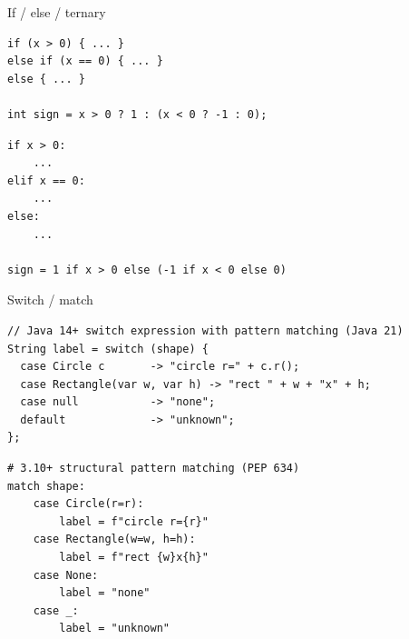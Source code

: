\documentclass[10pt]{article}
\begin{document}
\begin{construct}{If / else / ternary}
\noindent
\begin{minipage}[t]{0.485\linewidth}
\begin{lstlisting}[style=java, title=Java]
if (x > 0) { ... }
else if (x == 0) { ... }
else { ... }

int sign = x > 0 ? 1 : (x < 0 ? -1 : 0);
\end{lstlisting}
\end{minipage}\hfill
\begin{minipage}[t]{0.485\linewidth}
\begin{lstlisting}[style=python, title=Python]
if x > 0:
    ...
elif x == 0:
    ...
else:
    ...

sign = 1 if x > 0 else (-1 if x < 0 else 0)
\end{lstlisting}
\end{minipage}
\end{construct}

\begin{construct}{Switch / match}
\noindent
\begin{minipage}[t]{0.485\linewidth}
\begin{lstlisting}[style=java, title=Java]
// Java 14+ switch expression with pattern matching (Java 21)
String label = switch (shape) {
  case Circle c       -> "circle r=" + c.r();
  case Rectangle(var w, var h) -> "rect " + w + "x" + h;
  case null           -> "none";
  default             -> "unknown";
};
\end{lstlisting}
\end{minipage}\hfill
\begin{minipage}[t]{0.485\linewidth}
\begin{lstlisting}[style=python, title=Python]
# 3.10+ structural pattern matching (PEP 634)
match shape:
    case Circle(r=r):
        label = f"circle r={r}"
    case Rectangle(w=w, h=h):
        label = f"rect {w}x{h}"
    case None:
        label = "none"
    case _:
        label = "unknown"
\end{lstlisting}
\end{minipage}
\end{construct}

\end{document}
